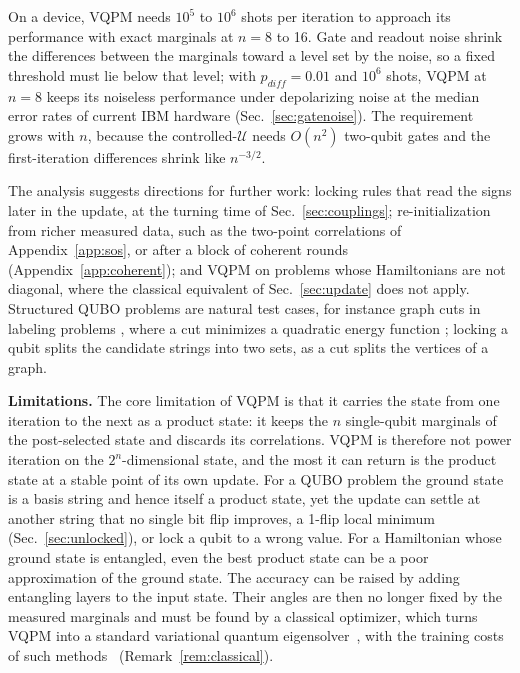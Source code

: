 \documentclass[onecolumn,10pt]{article}
\theoremstyle{remark}
\theoremstyle{plain}
\begin{document}
On a device, VQPM needs $10^5$ to $10^6$ shots per iteration to approach its performance with exact marginals at $n=8$ to 16. Gate and readout noise shrink the differences between the marginals toward a level set by the noise, so a fixed threshold must lie below that level; with $p_{diff}=0.01$ and $10^6$ shots, VQPM at $n=8$ keeps its noiseless performance under depolarizing noise at the median error rates of current IBM hardware (Sec.~\ref{sec:gatenoise}). The requirement grows with $n$, because the controlled-$\mathcal U$ needs $O(n^2)$ two-qubit gates and the first-iteration differences shrink like $n^{-3/2}$.

The analysis suggests directions for further work: locking rules that read the signs later in the update, at the turning time of Sec.~\ref{sec:couplings}; re-initialization from richer measured data, such as the two-point correlations of Appendix~\ref{app:sos}, or after a block of coherent rounds (Appendix~\ref{app:coherent}); and VQPM on problems whose Hamiltonians are not diagonal, where the classical equivalent of Sec.~\ref{sec:update} does not apply. Structured QUBO problems are natural test cases, for instance graph cuts in labeling problems \cite{komodakis2007approximate}, where a cut minimizes a quadratic energy function \cite{kolmogorov2004energy}; locking a qubit splits the candidate strings into two sets, as a cut splits the vertices of a graph.

\textbf{Limitations.} The core limitation of VQPM is that it carries the state from one iteration to the next as a product state: it keeps the $n$ single-qubit marginals of the post-selected state and discards its correlations. VQPM is therefore not power iteration on the $2^n$-dimensional state, and the most it can return is the product state at a stable point of its own update. For a QUBO problem the ground state is a basis string and hence itself a product state, yet the update can settle at another string that no single bit flip improves, a 1-flip local minimum (Sec.~\ref{sec:unlocked}), or lock a qubit to a wrong value. For a Hamiltonian whose ground state is entangled, even the best product state can be a poor approximation of the ground state. The accuracy can be raised by adding entangling layers to the input state. Their angles are then no longer fixed by the measured marginals and must be found by a classical optimizer, which turns VQPM into a standard variational quantum eigensolver~\cite{peruzzo2014variational}, with the training costs of such methods~\cite{bittel2021training} (Remark~\ref{rem:classical}).
\end{document}
